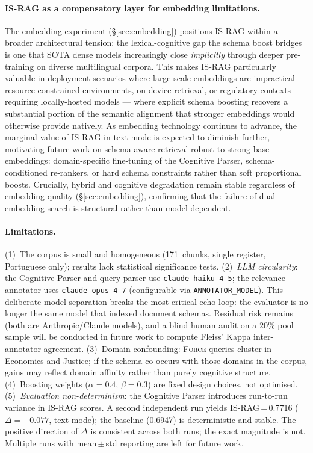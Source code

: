 \documentclass[11pt,a4paper]{article}
\begin{document}
\paragraph{IS-RAG as a compensatory layer for embedding limitations.}
The embedding experiment (\S\ref{sec:embedding}) positions IS-RAG within
a broader architectural tension: the lexical-cognitive gap the schema
boost bridges is one that SOTA dense models increasingly close
\emph{implicitly} through deeper pre-training on diverse multilingual
corpora.
This makes IS-RAG particularly valuable in deployment scenarios where
large-scale embeddings are impractical --- resource-constrained
environments, on-device retrieval, or regulatory contexts requiring
locally-hosted models --- where explicit schema boosting recovers a
substantial portion of the semantic alignment that stronger embeddings
would otherwise provide natively.
As embedding technology continues to advance, the marginal value of IS-RAG
in text mode is expected to diminish further, motivating future work on
schema-aware retrieval robust to strong base embeddings: domain-specific
fine-tuning of the Cognitive Parser, schema-conditioned re-rankers, or
hard schema constraints rather than soft proportional boosts.
Crucially, hybrid and cognitive degradation remain stable regardless of
embedding quality (\S\ref{sec:embedding}), confirming that the failure
of dual-embedding search is structural rather than model-dependent.

\paragraph{Limitations.}
(1)~The corpus is small and homogeneous (171~chunks, single register,
Portuguese only); results lack statistical significance tests.
(2)~\emph{LLM circularity}: the Cognitive Parser and query parser use
\texttt{claude-haiku-4-5}; the relevance annotator uses
\texttt{claude-opus-4-7} (configurable via \texttt{ANNOTATOR\_MODEL}).
This deliberate model separation breaks the most critical echo loop:
the evaluator is no longer the same model that indexed document
schemas.
Residual risk remains (both are Anthropic/Claude models), and a blind
human audit on a 20\% pool sample will be conducted in future work to
compute Fleiss' Kappa inter-annotator agreement.
(3)~Domain confounding: \textsc{Force} queries cluster in Economics
and Justice; if the schema co-occurs with those domains in the corpus,
gains may reflect domain affinity rather than purely cognitive
structure.
(4)~Boosting weights ($\alpha{=}0.4$, $\beta{=}0.3$) are fixed design
choices, not optimised.
(5)~\emph{Evaluation non-determinism}: the Cognitive Parser introduces
run-to-run variance in IS-RAG scores.
A second independent run yields IS-RAG\,=\,0.7716 ($\Delta=+0.077$,
text mode); the baseline (0.6947) is deterministic and stable.
The positive direction of $\Delta$ is consistent across both runs;
the exact magnitude is not.
Multiple runs with mean\,$\pm$\,std reporting are left for future work.
\end{document}
